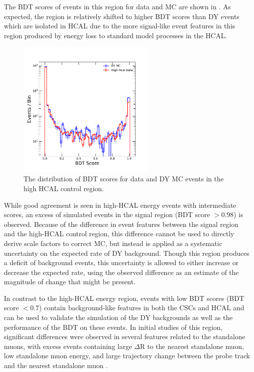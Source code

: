 The BDT scores of events in this region for data and MC are shown in .
As expected, the region is relatively shifted to higher BDT scores than DY events which are isolated in HCAL due to the more signal-like event features in this region produced by energy loss to standard model processes in the HCAL. 

\begin{figure}[htbp]
	\label{fig:BDTscorevalid}
	\centering
	\includegraphics[width=0.6\textwidth]{figures/highHcalValid.pdf}
        \caption[BDT Validation in the High HCAL Energy Control Region]{The distribution of BDT scores for data and DY MC events in the high HCAL control region.}
\end{figure}

While good agreement is seen in high-HCAL energy events with intermediate scores, an excess of simulated events in the signal region (BDT score $>$0.98) is observed.
Because of the difference in event features between the signal region and the high-HCAL control region, this difference cannot be used to directly derive scale factors to correct MC, but instead is applied as a systematic uncertainty on the expected rate of DY background.
Though this region produces a deficit of background events, this uncertainty is allowed to either increase or decrease the expected rate, using the observed difference as an estimate of the magnitude of change that might be present.

In contrast to the high-HCAL energy region, events with low BDT scores (BDT score $<0.7$) contain background-like features in both the CSCs and HCAL and can be used to validate the simulation of the DY backgrounds as well as the performance of the BDT on these events.
In initial studies of this region, significant differences were observed in several features related to the standalone muons, with excess events containing large $\Delta$R to the nearest standalone muon, low standalone muon energy, and large trajectory change between the probe track and the nearest standalone muon .


